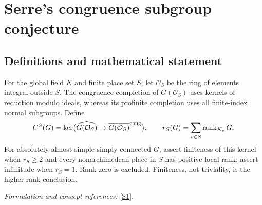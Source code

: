 \documentclass[11pt,a4paper]{article}
\newcommand{\sref}[2]{\hyperlink{source:#1:#2}{[S#2]}}
\newif\ifshowcatalogue
\newcommand{\cataloguescope}[1]{\ifshowcatalogue
 \paragraph{Exact scope in the supplied catalogue.}
 \begin{quote}\small #1\end{quote}\fi}
\numberwithin{equation}{section}
\begin{document}
\setcounter{section}{118}
\clearpage
\section{\texorpdfstring{Serre's congruence subgroup conjecture}{Serre's congruence subgroup conjecture}}\label{119}
\subsection{Definitions and mathematical statement}
For the global field $K$ and finite place set $S$, let $\mathcal O_S$ be the ring of elements integral outside $S$. The congruence completion of $G(\mathcal O_S)$ uses kernels of reduction modulo ideals, whereas its profinite completion uses all finite-index normal subgroups. Define
\[
 C^S(G)=\ker\bigl(\widehat{G(\mathcal O_S)}\to\overline{G(\mathcal O_S)}^{\rm cong}\bigr),
 \qquad r_S(G)=\sum_{v\in S}\operatorname{rank}_{K_v}G.
\]
For absolutely almost simple simply connected $G$, assert finiteness of this kernel when $r_S\ge2$ and every nonarchimedean place in $S$ has positive local rank; assert infinitude when $r_S=1$. Rank zero is excluded. Finiteness, not triviality, is the higher-rank conclusion.
\par\smallskip\textit{Formulation and concept references:} \sref{119}{1}.
\cataloguescope{Let K be a global field (a number field or the function field of a curve over a finite field), G an absolutely almost simple simply connected algebraic K-group, and S a finite nonempty set of places of K containing every archimedean place when K is a number field. Put r\_S(G) = sum over v in S of rank\_\{K\_v\}(G), and let C\textasciicircum{}S(G) be the kernel of the natural surjection from the profinite completion of G(O\_S) (S-arithmetic topology) onto its S-congruence completion. Prove Serre's congruence subgroup conjecture: (a) if r\_S(G) >= 2 and rank\_\{K\_v\}(G) > 0 for every nonarchimedean v in S, then C\textasciicircum{}S(G) is finite; (b) if r\_S(G) = 1, then C\textasciicircum{}S(G) is infinite. The case r\_S(G) = 0 (finite G(O\_S), trivial kernel) is excluded. Finiteness of C\textasciicircum{}S(G) is the assertion; triviality is a stronger statement not required. Which specific groups remain unsettled is status information, not part of the target.}
\end{document}
